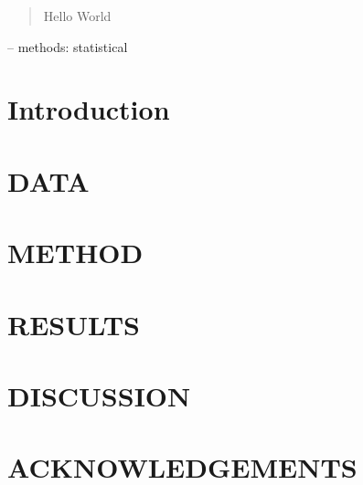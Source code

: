 \documentclass[letterpaper,useAMS,usenatbib]{mn2e}
\title[Characterizing galaxy-dark matter offsets in galaxy clusters of the
Illustris simulation]
{}
\author[Karen Y. Ng et al.]{Karen Y. Ng,$^{1}$
	Annalisa P. Pillepich, $^{2}$ 
	William A. Dawson,$^{3}$ 
	D. Wittman,$^{1}$
}
\begin{document}
\date{arXiv} \pagerange{\pageref{firstpage}--\pageref{lastpage}}
 \maketitle\label{firstpage}
\begin{abstract} 
	Hello World
\end{abstract}
\begin{keywords}
-- methods: statistical 
\end{keywords}
\section{Introduction} 
\section{DATA} 
\section{METHOD} 
\section{RESULTS} 
\section{DISCUSSION}
\section{ACKNOWLEDGEMENTS}



\appendix
\clearpage\bsp\label{lastpage} 
\end{document}
